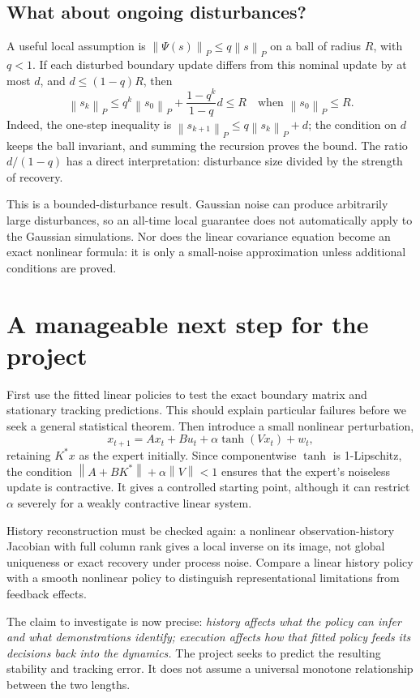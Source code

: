 \documentclass[12 pt]{article}        	%
\theoremstyle{definition}
\newcommand{\norm}[1]{\left\|#1\right\|}
\begin{document}
\subsection{What about ongoing disturbances?}
A useful local assumption is
$\norm{\Psi(s)}_P\le q\norm{s}_P$ on a ball of radius $R$, with $q<1$. If each disturbed boundary update differs from this nominal update by at most $d$, and $d\le(1-q)R$, then
\[
\norm{s_k}_P\le q^k\norm{s_0}_P+\frac{1-q^k}{1-q}d\le R
\quad\text{when }\norm{s_0}_P\le R.
\]
Indeed, the one-step inequality is $\norm{s_{k+1}}_P\le q\norm{s_k}_P+d$; the condition on $d$ keeps the ball invariant, and summing the recursion proves the bound. The ratio $d/(1-q)$ has a direct interpretation: disturbance size divided by the strength of recovery.

This is a bounded-disturbance result. Gaussian noise can produce arbitrarily large disturbances, so an all-time local guarantee does not automatically apply to the Gaussian simulations. Nor does the linear covariance equation become an exact nonlinear formula: it is only a small-noise approximation unless additional conditions are proved.

\section{A manageable next step for the project}
First use the fitted linear policies to test the exact boundary matrix and stationary tracking predictions. This should explain particular failures before we seek a general statistical theorem. Then introduce a small nonlinear perturbation,
\[
x_{t+1}=Ax_t+Bu_t+\alpha\tanh(Vx_t)+w_t,
\]
retaining $K^*x$ as the expert initially. Since componentwise $\tanh$ is 1-Lipschitz, the condition $\norm{A+BK^*}+\alpha\norm{V}<1$ ensures that the expert's noiseless update is contractive. It gives a controlled starting point, although it can restrict $\alpha$ severely for a weakly contractive linear system.

History reconstruction must be checked again: a nonlinear observation-history Jacobian with full column rank gives a local inverse on its image, not global uniqueness or exact recovery under process noise. Compare a linear history policy with a smooth nonlinear policy to distinguish representational limitations from feedback effects.

The claim to investigate is now precise: \emph{history affects what the policy can infer and what demonstrations identify; execution affects how that fitted policy feeds its decisions back into the dynamics.} The project seeks to predict the resulting stability and tracking error. It does not assume a universal monotone relationship between the two lengths.
\end{document}
